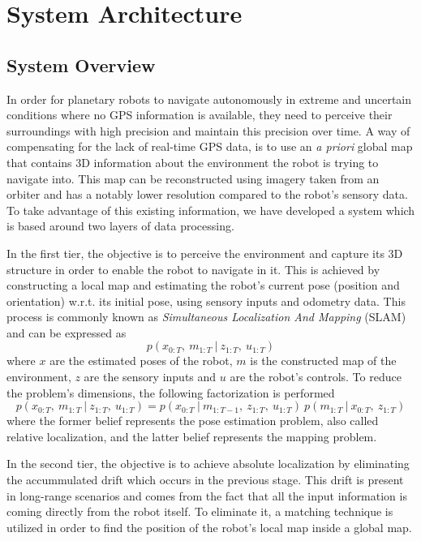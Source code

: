 \label{Chapter2}

\chapter{System Architecture}

\section{System Overview}

In order for planetary robots to navigate autonomously in extreme and
uncertain conditions where no GPS information is available,
they need to perceive their surroundings with high precision and
maintain this precision over time.
A way of compensating for the lack of real-time GPS data, is to use
an \textit{a priori} global map that contains 3D information about the
environment the robot is trying to navigate into.
This map can be reconstructed using imagery taken from an orbiter and
has a notably lower resolution compared to the robot's sensory data.
To take advantage of this existing information, we have developed a system
which is based around two layers of data processing.

In the first tier, the objective is to perceive the environment and
capture its 3D structure in order to enable the robot to navigate in it.
This is achieved by constructing a local map and estimating the robot's
current pose (position and orientation) w.r.t. its initial pose,
using sensory inputs and odometry data.
This process is commonly known as
\textit{Simultaneous Localization And Mapping} (SLAM) and can be expressed as
\begin{equation}
    p(x_{0:T} ,\ m_{1:T} \ | \ z_{1:T} ,\ u_{1:T})
\end{equation}
where
$x$ are the estimated poses of the robot,
$m$ is the constructed map of the environment,
$z$ are the sensory inputs and
$u$ are the robot's controls.
To reduce the problem's dimensions, the following factorization is performed
\begin{equation}
    p(x_{0:T} ,\ m_{1:T} \ | \ z_{1:T} ,\ u_{1:T}) =
    p(x_{0:T} \ | \ m_{1:T-1} ,\ z_{1:T} ,\ u_{1:T}) \
    p(m_{1:T} \ | \ x_{0:T} ,\ z_{1:T})
\end{equation}
where
the former belief represents the pose estimation problem, also called
relative localization, and the latter belief represents the mapping problem.

In the second tier, the objective is to achieve absolute localization by
eliminating the accummulated drift which occurs in the previous stage.
This drift is present in long-range scenarios and comes from the fact that
all the input information is coming directly from the robot itself.
To eliminate it, a matching technique is utilized in order to find the
position of the robot's local map inside a global map.

